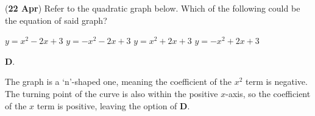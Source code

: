 \documentclass[12pt, answers]{exam}
\begin{document}
\begin{questions}
	\question (\textbf{22 Apr}) Refer to the quadratic graph below.
	Which of the following could be the equation of said graph?
	\begin{figure}[htpb]
		\centering
	\end{figure}
	\begin{choices}
		\choice \(y = x^{2} - 2x + 3\)
		\choice \(y = -x^{2} - 2x + 3\)
		\choice \(y = x^{2} + 2x + 3\)
		\choice \(y = -x^{2} + 2x + 3\)
	\end{choices}
	\begin{solution}
		\textbf{D}.

		The graph is a `n'-shaped one, meaning the coefficient of the \(x^{2}\) term is negative.
		The turning point of the curve is also within the positive \(x\)-axis, so the coefficient
		of the \(x\) term is positive, leaving the option of \textbf{D}.
	\end{solution}
\end{questions}
\end{document}
